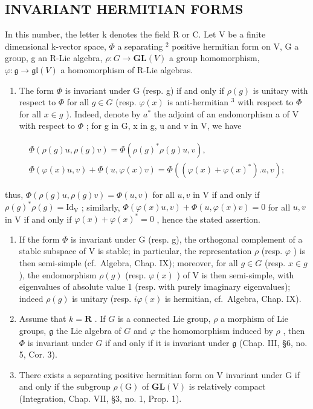 \subsection{INVARIANT HERMITIAN FORMS}

In this number, the letter k denotes the field R or C. Let V be a finite dimensional k-vector space, \(\Phi\) a separating \(^{2}\) positive hermitian form on V, G a group, g an R-Lie algebra, \(\rho: G \to \mathbf{GL}(V)\) a group homomorphism, \(\varphi: \mathfrak{g} \to \mathfrak{gl}(V)\) a homomorphism of R-Lie algebras.

\begin{enumerate}
\def\labelenumi{\alph{enumi})}
\tightlist
\item
  The form \(\Phi\) is invariant under G (resp. g) if and only if \(\rho(g)\) is unitary with respect to \(\Phi\) for all \(g \in G\) (resp. \(\varphi(x)\) is anti-hermitian \(^{3}\) with respect to \(\Phi\) for all \(x \in g\) ). Indeed, denote by \(a^{*}\) the adjoint of an endomorphism a of V with respect to \(\Phi\) ; for g in G, x in g, u and v in V, we have
\end{enumerate}

\[
\begin{array}{c} \Phi (\rho (g) u, \rho (g) v) = \Phi (\rho (g) ^ {*} \rho (g) u, v), \\ \Phi (\varphi (x) u, v) + \Phi (u, \varphi (x) v) = \Phi ((\varphi (x) + \varphi (x) ^ {*}). u, v); \end{array}
\]

thus, \(\Phi(\rho(g)u,\rho(g)v)=\Phi(u,v)\) for all \(u,v\) in V if and only if \(\rho(g)^{*}\rho(g)=\mathrm{Id}_{\mathrm{V}}\) ; similarly, \(\Phi(\varphi(x)u,v)+\Phi(u,\varphi(x)v)=0\) for all \(u,v\) in V if and only if \(\varphi(x)+\varphi(x)^{*}=0\) , hence the stated assertion.

\begin{enumerate}
\def\labelenumi{\alph{enumi})}
\setcounter{enumi}{1}
\item
  If the form \(\varPhi\) is invariant under G (resp. g), the orthogonal complement of a stable subspace of V is stable; in particular, the representation \(\rho\) (resp. \(\varphi\) ) is then semi-simple (cf.~Algebra, Chap. IX); moreover, for all \(g \in G\) (resp. \(x \in g\) ), the endomorphism \(\rho(g)\) (resp. \(\varphi(x)\) ) of V is then semi-simple, with eigenvalues of absolute value 1 (resp. with purely imaginary eigenvalues); indeed \(\rho(g)\) is unitary (resp. \(i\varphi(x)\) is hermitian, cf.~Algebra, Chap. IX).
\item
  Assume that \(k = \mathbf{R}\) . If \(G\) is a connected Lie group, \(\rho\) a morphism of Lie groups, \(\mathfrak{g}\) the Lie algebra of \(G\) and \(\varphi\) the homomorphism induced by \(\rho\) , then \(\varPhi\) is invariant under \(G\) if and only if it is invariant under \(\mathfrak{g}\) (Chap. III, §6, no. 5, Cor. 3).
\item
  There exists a separating positive hermitian form on V invariant under G if and only if the subgroup \(\rho(\mathrm{G})\) of \(\mathbf{GL}(\mathrm{V})\) is relatively compact (Integration, Chap. VII, §3, no. 1, Prop. 1).
\end{enumerate}

